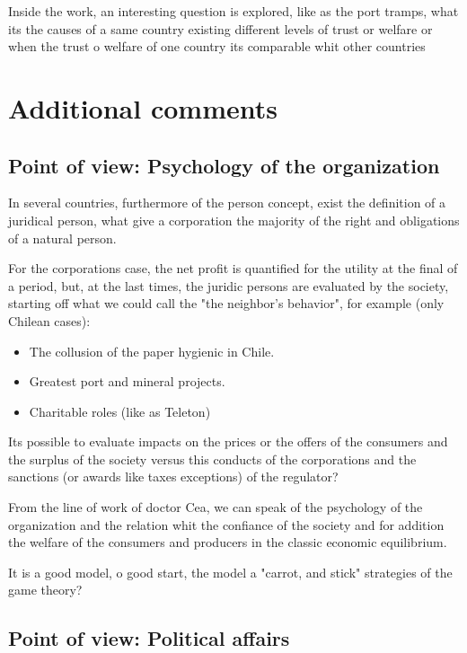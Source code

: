 \documentclass{article}
\begin{document}
Inside the work, an interesting question is explored, like as the port tramps, what its the causes of a same country existing different levels of trust or welfare or when the trust o welfare of one country its comparable whit other countries

\section{Additional comments}

\subsection{Point of view: Psychology of the organization }

In several countries, furthermore of the person concept, 
exist the definition of a juridical person, what give a corporation the majority of the right and obligations of a natural person.

For the corporations case, the net profit is quantified for the utility at the final of a period, but, at the last times, the juridic persons are evaluated by the society, starting off what we could call the "the neighbor's behavior", for example (only Chilean cases):

\begin{itemize}
    \item The collusion of the paper hygienic in Chile.
    \item Greatest port and mineral projects.
    \item Charitable roles (like as Teleton)
\end{itemize}

Its possible to evaluate impacts on the prices or the offers of the consumers and the surplus of the society versus this conducts of the corporations and the sanctions (or awards like taxes exceptions) of the regulator?

From the line of work of doctor Cea, we can speak of the psychology of the organization and the relation whit the confiance of the society and for addition the welfare of the consumers and producers in the classic economic equilibrium.

It is a good model, o good start, the model a "carrot, and stick" strategies of the game theory?

\subsection{Point of view: Political affairs}
\end{document}
